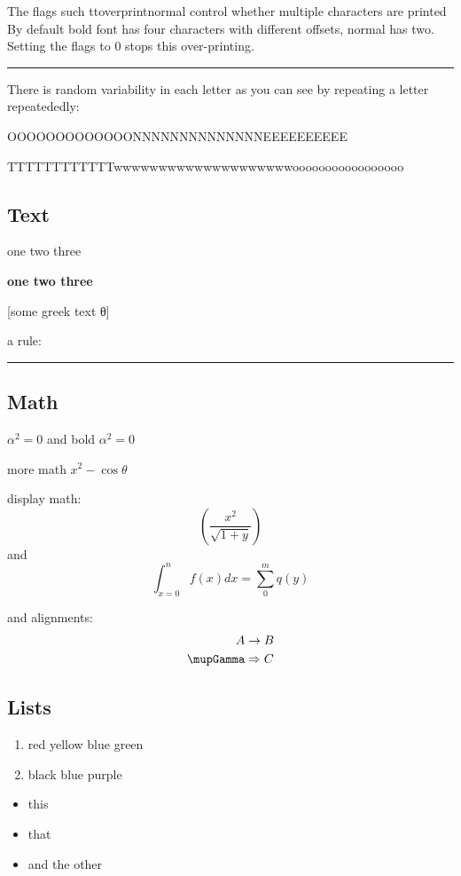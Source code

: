 \documentclass{article}
\begin{document}
The flags such ttoverprintnormal control whether multiple characters are printed
By default bold font has four characters with different offsets, normal has two.
Setting the flags to 0 stops this over-printing.

\hrule

There is random variability in each letter as you can see by repeating
a letter repeatededly:

OOOOOOOOOOOOONNNNNNNNNNNNNNEEEEEEEEEE

TTTTTTTTTTTTwwwwwwwwwwwwwwwwwwwwooooooooooooooooo




\subsection{Text}

one two three

\textbf{one two three}

[some greek text θ]

a  rule: \rule{3cm}{1pt}

\subsection{Math}

$\alpha^2=0$ and bold {\boldmath $\alpha^2=0$}



more math $x^2-\cos θ$


display math:
\[\left(\frac{x^2}{\sqrt{1+y}}\right)\]
and
\[\int_{x=0}^n f(x) dx = \sum_0^m q(y)\]

and alignments:
\begin{align}
A &\rightarrow B\\
\mupGamma &\Rightarrow C
\end{align}


\subsection{Lists}

\begin{enumerate}
\item red yellow blue green
\item black blue purple
\end{enumerate}

\begin{itemize}
\item this
\item that
\item and the other
\end{itemize}
\end{document}
